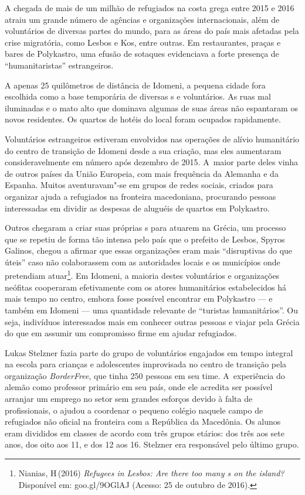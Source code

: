  

A chegada de mais de um milhão de refugiados na costa grega entre 2015 e
2016 atraiu um grande número de agências e organizações internacionais,
além de voluntários de diversas partes do mundo, para as áreas do país
mais afetadas pela crise migratória, como Lesbos e Kos, entre outras. Em
restaurantes, praças e bares de Polykastro, uma efusão de sotaques
evidenciava a forte presença de ``humanitaristas'' estrangeiros.

A apenas 25 quilômetros de distância de Idomeni, a pequena cidade fora
escolhida como a base temporária de diversas s e voluntários. As ruas
mal iluminadas e o mato alto que dominava algumas de suas áreas não
espantaram os novos residentes. Os quartos de hotéis do local foram
ocupados rapidamente.

Voluntários estrangeiros estiveram envolvidos nas operações de alívio
humanitário do centro de transição de Idomeni desde a sua criação, mas
eles aumentaram consideravelmente em número após dezembro de 2015. A~maior parte deles vinha de outros países da União Europeia, com mais
frequência da Alemanha e da Espanha. Muitos aventuravam"-se em grupos de
redes sociais, criados para organizar ajuda a refugiados na fronteira
macedoniana, procurando pessoas interessadas em dividir as despesas de
aluguéis de quartos em Polykastro.

Outros chegaram a criar suas próprias s para atuarem na Grécia, um
processo que se repetiu de forma tão intensa pelo país que o prefeito de
Lesbos, Spyros Galinos, chegou a afirmar que essas organizações eram
mais ``disruptivas do que úteis'' caso não colaborassem com as
autoridades locais e os municípios onde pretendiam
atuar\footnote{ Nianias, H\,(2016) \emph{Refugees in Lesbos: Are
there too many s on the island?} Disponível em:
goo.gl/9OGlAJ
(Acesso: 25 de outubro de 2016).}. Em Idomeni, a maioria destes voluntários e
organizações neófitas cooperaram efetivamente com os atores humanitários
estabelecidos há mais tempo no centro, embora fosse possível encontrar
em Polykastro --- e também em Idomeni --- uma quantidade relevante de
``turistas humanitários''. Ou seja, indivíduos interessados mais em
conhecer outras pessoas e viajar pela Grécia do que em assumir um
compromisso firme em ajudar refugiados.

Lukas Stelzner fazia parte do grupo de voluntários engajados em tempo
integral na escola para crianças e adolescentes improvisada no centro de
transição pela organização \emph{BorderFree}, que tinha 250 pessoas em
seu time. A~experiência do alemão como professor primário em seu país,
onde ele acredita ser possível arranjar um emprego no setor sem grandes
esforços devido à falta de profissionais, o ajudou a coordenar o pequeno
colégio naquele campo de refugiados não oficial na fronteira com a
República da Macedônia. Os alunos eram divididos em classes de acordo
com três grupos etários: dos três aos sete anos, dos oito aos 11, e dos
12 aos 16. Stelzner era responsável pelo último grupo.

